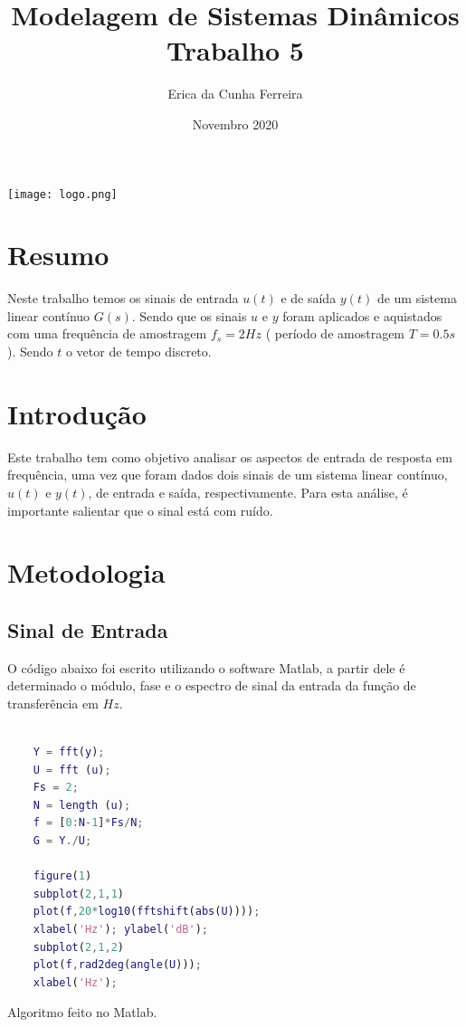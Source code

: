 \documentclass[12pt]{article}
\title{%
    Modelagem de Sistemas Dinâmicos\\
    \large Trabalho 5}
\author{Erica da Cunha Ferreira}
\date{Novembro 2020}
\begin{document}
\maketitle
{}
\vspace{8cm} %
\begin{center}
    \texttt{[image: logo.png]}
\end{center}

\newpage
\tableofcontents
\newpage
{}

\cleardoublepage{}

\section{Resumo}

\quad Neste trabalho temos os sinais de entrada $u(t)$ e de saída $y(t)$ de um sistema linear contínuo $G(s)$. Sendo que os sinais $u$ e $y$ foram aplicados e aquistados com uma frequência de amostragem $f_s = 2Hz$ ( período de amostragem $T = 0.5s$). Sendo $t$ o vetor de tempo discreto.

\section{Introdução}

\quad Este trabalho tem como objetivo analisar os aspectos de entrada de resposta em frequência, uma vez que foram dados dois sinais de um sistema linear contínuo,$u(t)$ e $y(t)$, de entrada e saída, respectivamente. Para esta análise, é importante salientar que o sinal está  com ruído. 

\section{Metodologia}
\subsection{Sinal de Entrada}
\quad O código abaixo foi escrito utilizando o software Matlab, a partir dele é determinado o módulo, fase e o espectro de sinal da entrada da função de transferência em $Hz$.

\begin{lstlisting}[language = Matlab]

    Y = fft(y);
    U = fft (u);
    Fs = 2;
    N = length (u);
    f = [0:N-1]*Fs/N;
    G = Y./U;

    figure(1)
    subplot(2,1,1)
    plot(f,20*log10(fftshift(abs(U))));
    xlabel('Hz'); ylabel('dB');
    subplot(2,1,2)
    plot(f,rad2deg(angle(U)));
    xlabel('Hz'); 
\end{lstlisting}
\quad Algoritmo feito no Matlab.\\
\end{document}
